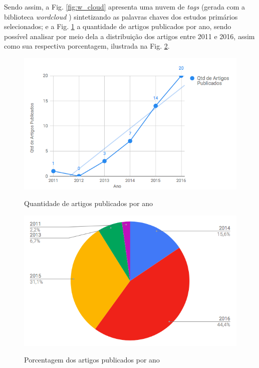 \documentclass[
	12pt,				%
	oneside,			%
	a4paper,			%
	english,			%
	brazil				%
	]{abntex2ppgsi}
\begin{document}
Sendo assim, a Fig. \ref{fig:w_cloud} apresenta uma nuvem de \textit{tags} (gerada com a biblioteca \textit{wordcloud} \cite{wordcloud}) sintetizando as palavras chaves dos estudos primários selecionados; e a Fig. \ref{fig:qtd} a quantidade de artigos publicados por ano, sendo possível analisar por meio dela a distribuição dos artigos entre 2011 e 2016, assim como sua respectiva porcentagem, ilustrada na Fig. \ref{fig:porcentagem}.

\begin{figure}[H]%
	\centering
 	  \caption{Quantidade de artigos publicados por ano}
		\includegraphics[width=0.8\linewidth]{images/g1.png}
	\label{fig:qtd}
\end{figure}

\begin{figure}[H]%
	\centering
 	  \caption{Porcentagem dos artigos publicados por ano}
		\includegraphics[width=0.8\linewidth]{images/g2.png}
	\label{fig:porcentagem}
\end{figure}
\end{document}
